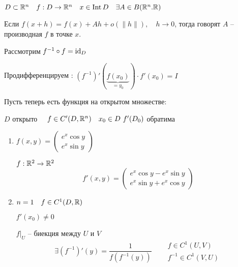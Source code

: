     $D \subset \mathbb{R}^n \quad f : D \rightarrow \mathbb{R}^n \quad x \in \operatorname{Int} D \quad \exists A \in B(\mathbb{R}^n. \mathbb{R})$
    
    \begin{definition}
        Если $f(x + h) = f(x) + Ah + o(\|h\|), \quad h \rightarrow 0$, тогда говорят $A$ -- производная $f$ в точке $x$.
    \end{definition}

    \begin{figure}[ht]
        \centering
        \label{fig:figurka}
    \end{figure}


    Рассмотрим $f^{-1} \circ f = \operatorname*{id}_D$

    Продифференцируем : $(f^{-1})'(\underbrace{f(x_0)}_{= y_0}) \cdot f'(x_0) = I$

    Пусть теперь есть функция на открытом множестве:

    $D$ открыто $\quad f \in C'(D, \mathbb{R}^n) \quad x _0 \in D \ f'(D_0)$ обратима

    \begin{illustration}\leavevmode
        \begin{enumerate}
            \item $f(x, y) = \begin{pmatrix}e^x \cos y \\ e^x \sin y \end{pmatrix}$
            \par $f : \mathbb{R}^2 \rightarrow \mathbb{R}^2$
            \[
                f'(x, y) = \begin{pmatrix} e^x\cos y - e^x\sin y \\ e^x\sin y + e^x\cos y \end{pmatrix}    
            \]
            \item $n = 1 \quad f \in C^1(D, \mathbb{R})$
            \par $f'(x_0) \not= 0$
            \par $f\big|_U$ -- биекция между $U$ и $V$
            \[
                \exists (f^{-1})'(y) = \frac{1}{f(f^{-1}(y))} \quad \begin{aligned} &f \in C^1(U, V) \\ &f^{-1} \in C^1(V, U) \end{aligned}    
            \]
        \end{enumerate}
    \end{illustration}

